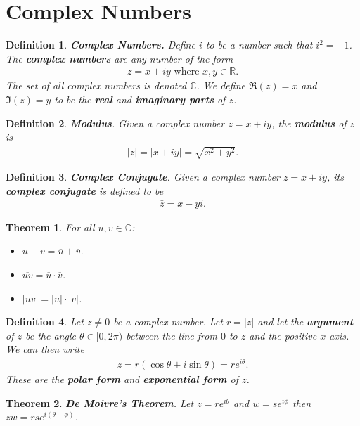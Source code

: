 \documentclass{article}
\theoremstyle{sltheorem}
\newtheorem{definition}{Definition}[section]
\newtheorem{theorem}{Theorem}[section]
\newcommand{\R}{\mathbb{R}}
\newcommand{\C}{\mathbb{C}}
\newcommand*\lneg[1]{\overline{#1}}
\newcommand*\B[1]{\textbf{#1}}
\begin{document}
\section{Complex Numbers}
\begin{definition}
    \B{Complex Numbers.} Define $i$ to be a number such that $i^2 = -1$. 
    The \B{complex numbers} are any number of the form
    \begin{align*}
        z = x+iy \text{ where } x,y\in\R.
    \end{align*}
    The set of all complex numbers is denoted $\mathbb{C}$. We define $\Re(z) = x$ and $\Im(z)=y$ to be the \B{real} and \B{imaginary parts} of $z$.
\end{definition}
\begin{definition}
    \B{Modulus}. Given a complex number $z=x+iy$, the \B{modulus} of $z$ is
    \begin{align*}
        |z|=|x+iy|=\sqrt{x^2+y^2}.
    \end{align*}
\end{definition}
\begin{definition}
    \B{Complex Conjugate}. Given a complex number $z=x+iy$, its \B{complex conjugate} is defined to be
    \begin{align*}
        \bar{z}=x-yi.
    \end{align*}
\end{definition}
\begin{theorem}
    For all $u,v\in\C$:
    \begin{itemize}
        \item $\lneg{u+v}=\lneg{u}+\lneg{v}$.
        \item $\lneg{uv}=\lneg{u}\cdot\lneg{v}$.
        \item $|uv|=|u|\cdot|v|$.
    \end{itemize}
\end{theorem}
\begin{definition}
    Let $z\not=0$ be a complex number. 
    Let $r=|z|$ and let the \B{argument} of $z$ be the angle $\theta\in[0,2\pi)$ between the line from $0$ to $z$ and the positive $x$-axis. We can then write
    \begin{align*}
        z = r(\cos\theta+i\sin\theta)=re^{i\theta}.
    \end{align*}
    These are the \B{polar form} and \B{exponential form} of $z$.
\end{definition}
\begin{theorem}
    \B{De Moivre's Theorem}. Let $z=re^{i\theta}$ and $w=se^{i\phi}$ then $zw=rse^{i(\theta+\phi)}$.
\end{theorem}
\end{document}
